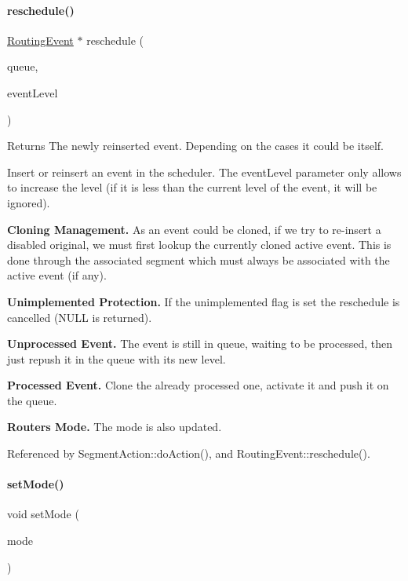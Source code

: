\paragraph{\texorpdfstring{reschedule()}{reschedule()}}
{\footnotesize\ttfamily \mbox{\hyperlink{classKite_1_1RoutingEvent}{Routing\+Event}} $\ast$ reschedule (\begin{DoxyParamCaption}\item[{\mbox{\hyperlink{classKite_1_1RoutingEventQueue}{Routing\+Event\+Queue}} \&}]{queue,  }\item[{unsigned int}]{event\+Level }\end{DoxyParamCaption})}

\begin{DoxyReturn}{Returns}
The newly reinserted event. Depending on the cases it could be itself.
\end{DoxyReturn}
Insert or reinsert an event in the scheduler. The {\ttfamily event\+Level} parameter only allows to increase the level (if it is less than the current level of the event, it will be ignored).

{\bfseries Cloning Management.} As an event could be cloned, if we try to re-\/insert a disabled original, we must first lookup the currently cloned active event. This is done through the associated {\ttfamily segment} which must always be associated with the active event (if any).

{\bfseries Unimplemented Protection.} If the unimplemented flag is set the reschedule is cancelled ({\ttfamily N\+U\+LL} is returned).

{\bfseries Unprocessed Event.} The event is still in queue, waiting to be processed, then just repush it in the queue with it\textquotesingle{}s new level.

{\bfseries Processed Event.} Clone the already processed one, activate it and push it on the queue.

{\bfseries Router\textquotesingle{}s Mode.} The mode is also updated. 

Referenced by Segment\+Action\+::do\+Action(), and Routing\+Event\+::reschedule().

\mbox{\label{classKite_1_1RoutingEvent_a85982827650655ef9d6e1206874ead69}} 
\paragraph{\texorpdfstring{set\+Mode()}{setMode()}}
{\footnotesize\ttfamily void set\+Mode (\begin{DoxyParamCaption}\item[{unsigned int}]{mode }\end{DoxyParamCaption})}

